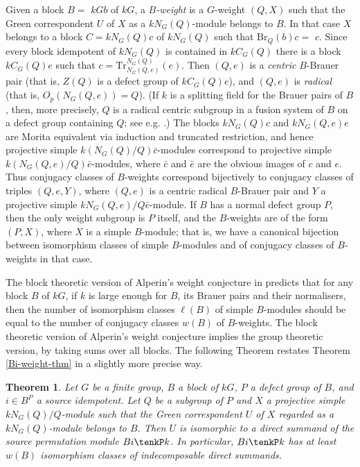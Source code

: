\documentclass{amsart}
\theoremstyle{plain}\newtheorem{Theorem}{Theorem}[section]
\theoremstyle{plain}\newtheorem{Conjecture}[Theorem]{Conjecture}
\theoremstyle{plain}\newtheorem{Corollary}[Theorem]{Corollary}
\theoremstyle{plain}\newtheorem{Lemma}[Theorem]{Lemma}
\theoremstyle{plain}\newtheorem{Proposition}[Theorem]{Proposition}
\theoremstyle{definition}\newtheorem{Definition}[Theorem]{Definition}
\theoremstyle{definition}\newtheorem{Example}[Theorem]{Example}
\theoremstyle{definition}\newtheorem{Examples}[Theorem]{Examples}
\theoremstyle{definition}\newtheorem{Exercise}[Theorem]{Exercise}
\theoremstyle{definition}\newtheorem{Notation}[Theorem]{Notation}
\theoremstyle{definition}\newtheorem{Remark}[Theorem]{Remark}
\theoremstyle{definition}\newtheorem{Remarks}[Theorem]{Remarks}
\theoremstyle{plain}\newtheorem{Statement}[Theorem]{}
\def\Br{\mathrm{Br}}                 \def\ten{\otimes}
\def\Tr{\mathrm{Tr}}             \def\tenOT{\otimes_{\mathcal{O}T}}
\begin{document}
Given  a block $B=$ $kGb$ of $kG$, a {\em $B$-weight} is a $G$-weight $(Q,X)$ such 
that the Green correspondent $U$ of $X$ as a $kN_G(Q)$-module belongs to $B$.
In that case $X$ belongs to a block $C=kN_G(Q)c$  of $kN_G(Q)$ such that 
$\Br_Q(b)c=$ $c$. Since every block idempotent of $kN_G(Q)$ is contained in
$kC_G(Q)$ there is a block $kC_G(Q)e$ such that $c=\Tr^{N_G(Q)}_{N_G(Q,e)}(e)$.
Then $(Q,e)$ is a {\em centric}  $B$-Brauer pair (that is, $Z(Q)$ is a defect group of 
$kC_G(Q)e$), and $(Q,e)$ is {\em radical} (that is, $O_p(N_G(Q,e))=Q$). 
(If $k$ is a splitting field for the Brauer pairs of $B$,
then, more precisely, $Q$ is a radical centric subgroup  in a fusion system of $B$ 
on a  defect group containing $Q$; see e.g. \cite[Theorem 6.10.8]{LiBookII}.)
The blocks $kN_G(Q)c$ and $kN_G(Q,e)e$ are Morita equivalent via induction
and truncated restriction, and hence projective simple $k(N_G(Q)/Q)  \bar c$-modules
correspond to projective simple $k(N_G(Q,e)/Q)\bar e$-modules, where $\bar c$ and 
$\bar e$ are the obvious images of $c$ and $e$. Thus conjugacy classes of $B$-weights
correspond bijectively to conjugacy classes of triples $(Q,e,Y)$, where
$(Q,e)$ is a centric radical  $B$-Brauer pair and $Y$ a projective simple 
$kN_G(Q,e)/Q\bar e$-module. If $B$ has a normal defect group $P$, then
the only weight subgroup is $P$ itself, and the $B$-weights are of the
form $(P,X)$, where $X$ is a simple $B$-module; that is, we have a
canonical bijection between isomorphism classes  of simple $B$-modules and
of conjugacy classes of $B$-weights in that case. 


The block theoretic version of Alperin's weight conjecture in \cite{Alp87}
predicts that for any block $B$ of $kG$,  if $k$ is large enough for $B$, its Brauer 
pairs and  their normalisers,  then
the number of isomorphism classes $\ell(B)$ of simple $B$-modules should be 
equal to the number of conjugacy classes $w(B)$ of $B$-weights. The block theoretic
version of Alperin's weight conjecture implies the group theoretic version,
by taking sums over all blocks. The following Theorem restates 
Theorem \ref{Bi-weight-thm} in a slightly more precise way.

\begin{Theorem} \label{Bi-weights}
Let $G$ be a finite group, $B$ a block of $kG$, $P$ a defect group of $B$, and
$i\in B^P$ a source idempotent. Let $Q$ be a subgroup of $P$ and
$X$ a projective simple $kN_G(Q)/Q$-module such that the Green correspondent
$U$ of $X$ regarded as a $kN_G(Q)$-module belongs to $B$. Then $U$ is
isomorphic to a direct summand of the source permutation module $Bi\tenkP k$.
In particular, $Bi\tenkP k$ has at least $w(B)$ isomorphism classes of
indecomposable direct summands.
\end{Theorem}
\end{document}
